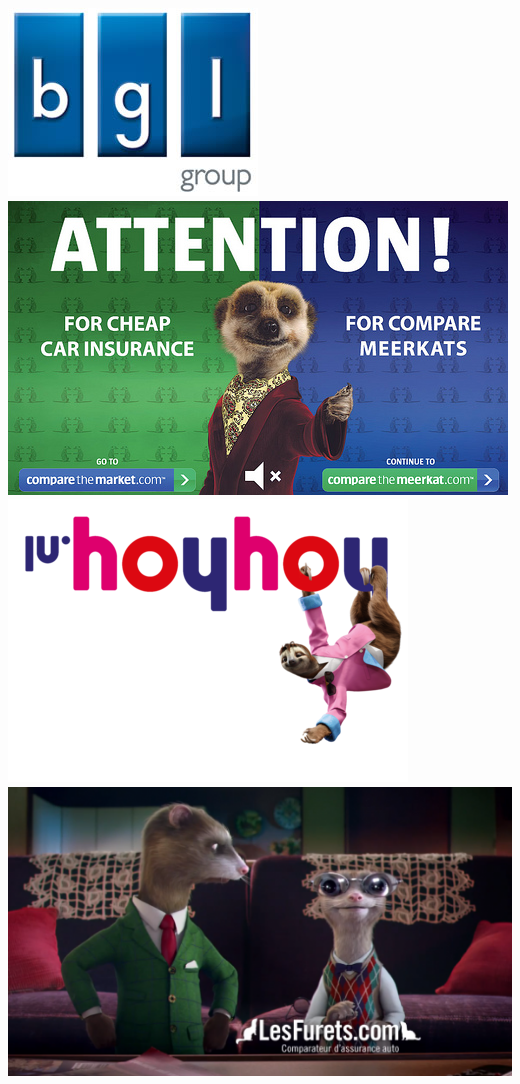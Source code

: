 \begin{center}
\vspace{2cm}
\newlength{\hauteur}
\setlength{\hauteur}{3cm}
\includegraphics{bgl/bgl.jpg}\\
\includegraphics[height=\hauteur]{bgl/comparethemarket.jpg}
\includegraphics[height=\hauteur]{bgl/hoyhoy.png}
\includegraphics[height=\hauteur]{bgl/lesfurets.png}
\end{center}
\clearpage
